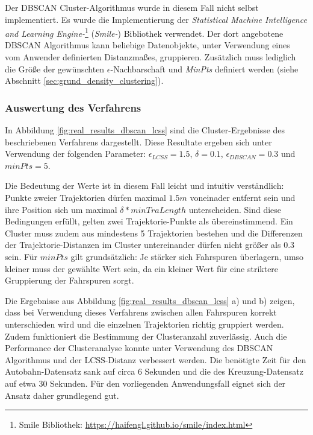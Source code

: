 Der DBSCAN Cluster-Algorithmus wurde in diesem Fall nicht selbst implementiert. Es wurde die Implementierung
der \textit{Statistical Machine Intelligence and Learning Engine-}\footnote{Smile Bibliothek: \url{https://haifengl.github.io/smile/index.html}}
(\textit{Smile-}) Bibliothek verwendet. Der dort angebotene DBSCAN Algorithmus kann beliebige Datenobjekte, unter Verwendung eines
vom Anwender definierten Distanzmaßes, gruppieren. Zusätzlich muss lediglich die Größe der gewünschten
$\epsilon$-Nachbarschaft und \textit{MinPts} definiert werden (siehe Abschnitt \ref{sec:grund_density_clustering}).

\subsubsection{Auswertung des Verfahrens}
\label{sec:results_clustering_dbscan_lcss}

In Abbildung \ref{fig:real_results_dbscan_lcss} sind die Cluster-Ergebnisse des beschriebenen Verfahrens
dargestellt. Diese Resultate ergeben sich unter Verwendung der folgenden Parameter:
$\epsilon_{LCSS} = 1.5$, $\delta = 0.1$, $\epsilon_{DBSCAN} = 0.3$ und $minPts = 5$.

Die Bedeutung der Werte ist in diesem Fall leicht und intuitiv verständlich: Punkte zweier Trajektorien
dürfen maximal $1.5m$ voneinader entfernt sein und ihre Position sich um maximal $\delta * minTraLength$ unterscheiden.
Sind diese Bedingungen erfüllt, gelten zwei Trajektorie-Punkte als übereinstimmend. Ein Cluster muss zudem aus mindestens
5 Trajektorien bestehen und die Differenzen der Trajektorie-Distanzen im Cluster untereinander dürfen nicht größer als 0.3 sein.
Für $minPts$ gilt grundsätzlich: Je stärker sich Fahrspuren überlagern, umso kleiner muss der gewählte Wert sein, da
ein kleiner Wert für eine striktere Gruppierung der Fahrspuren sorgt.

Die Ergebnisse aus Abbildung \ref{fig:real_results_dbscan_lcss} a) und b) zeigen, dass bei Verwendung
dieses Verfahrens zwischen allen Fahrspuren korrekt unterschieden wird und die einzelnen Trajektorien
richtig gruppiert werden. Zudem funktioniert die Bestimmung der Clusteranzahl zuverlässig.
Auch die Performance der Clusteranalyse konnte unter Verwendung des DBSCAN Algorithmus und der LCSS-Distanz
verbessert werden. Die benötigte Zeit für den Autobahn-Datensatz sank auf circa 6 Sekunden und die des
Kreuzung-Datensatz auf etwa 30 Sekunden. Für den vorliegenden Anwendungsfall eignet sich der Ansatz daher
grundlegend gut.

